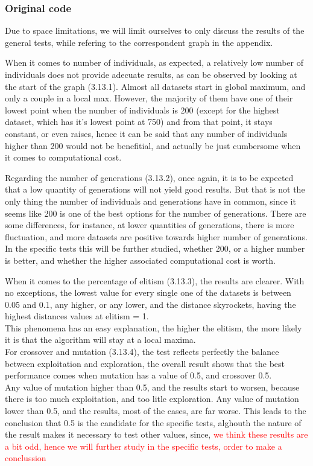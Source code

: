 \subsubsection{Original code}

Due to space limitations, we will limit ourselves to only discuss the results
of the general tests, while refering to the correspondent graph in the
appendix. 

When it comes to number of individuals, as expected, a relatively low number
of individuals does not provide adecuate results, as can be observed by looking
at the start of the graph (3.13.1). Almost all datasets start in global maximum, and only
a couple in a local max. However, the majority of them have one of their
lowest point when the number of individuals is 200 (except for the highest
dataset, which has it's lowest point at 750) and from that point, it stays
constant, or even raises, hence it can be said that any number of individuals higher than 200
would not be benefitial, and actually be just cumbersome when it comes to
computational cost.

Regarding the number of generations (3.13.2), once again, it is to be expected that a
low quantity of generations will not yield good results. But that is not the
only thing the number of individuals and generations have in common, since it
seems like 200 is one of the best options for the number of generations.
There are some differences, for instance, at lower quantities of
generations, there is more fluctuation, and more datasets are positive
towards higher number of generations. In the specific tests this will be
further studied, whether 200, or a higher number is better, and whether the
higher associated computational cost is worth.

When it comes to the percentage of elitism (3.13.3), the results are clearer.
With no exceptions, the lowest value for every single one of the datasets
is between 0.05 and 0.1, any higher, or any lower, and the distance
skyrockets, having the highest distances values at elitism = 1. \\
This phenomena has an easy explanation, the higher the elitism, the more likely it is that the
algorithm will stay at a local maxima. \\

For crossover and mutation (3.13.4), the test reflects perfectly the balance between exploitation and
exploration, the overall result shows that the best performance comes when
mutation has a value of 0.5, and crossover 0.5.\\
Any value of mutation higher than 0.5, and the results start to worsen, because
there is too much exploitation, and too litle exploration. Any value of mutation
lower than 0.5, and the results, most of the cases, are far worse. This leads to
the conclusion that 0.5 is the candidate for the specific tests, alghouth
the nature of the result makes it necessary to test other values, since,
\textcolor{red}{we think these results are a bit odd, hence we will further
study in the specific tests, order to make a conclussion}


